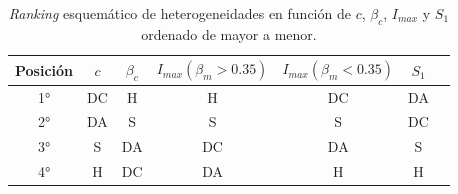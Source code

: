 \begin{table}[h]
    \centering
    \caption{\textit{Ranking} esquemático de heterogeneidades en función de $c$, $\beta_c$, $I_{max}$ y $S_1$ ordenado de mayor a menor.}
    \label{tab:ranking}
    \begin{tabular}{@{}ccccccc@{}}
    \toprule
    Posición & $c$  & $\beta_c$ & $I_{max}(\beta_m >0.35 )$ & $I_{max}(\beta_m <0.35 )$ & $S_1$ \\ \midrule
    1°    & DC & H & H & DC & DA\\
    2°    & DA & S & S & S & DC\\
    3°    & S  & DA  & DC & DA & S\\
    4°    & H  & DC  & DA & H &  H\\ \bottomrule
    \end{tabular}
\end{table}




